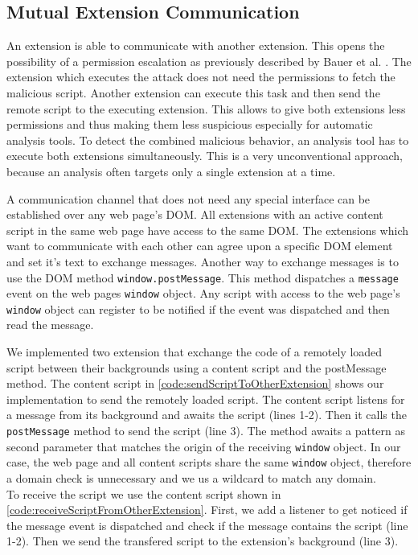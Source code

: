 	
\subsection{Mutual Extension Communication}
\label{sec:mutualExtensionCommunication}

	An extension is able to communicate with another extension. This opens the possibility of a permission escalation as previously described by Bauer et al. \cite{extensions:cns14}. The extension which executes the attack does not need the permissions to fetch the malicious script. Another extension can execute this task and then send the remote script to the executing extension. This allows to give both extensions less permissions and thus making them less suspicious especially for automatic analysis tools. To detect the combined malicious behavior, an analysis tool has to execute both extensions simultaneously. This is a very unconventional approach, because an analysis often targets only a single extension at a time. 
	
	A communication channel that does not need any special interface can be established over any web page's DOM. All extensions with an active content script in the same web page have access to the same DOM. The extensions which want to communicate with each other can agree upon a specific DOM element and set it's text to exchange messages. Another way to exchange messages is to use the DOM method \texttt{window.postMessage}. This method dispatches a \texttt{message} event on the web pages \texttt{window} object. Any script with access to the web page's \texttt{window} object can register to be notified if the event was dispatched and then read the message. 
	
	We implemented two extension that exchange the code of a remotely loaded script between their backgrounds using a content script and the postMessage method. The content script in \autoref{code:sendScriptToOtherExtension} shows our implementation to send the remotely loaded script. The content script listens for a message from its background and awaits the script (lines 1-2). Then it calls the \texttt{postMessage} method to send the script (line 3). The method awaits a pattern as second parameter that matches the origin of the receiving \texttt{window} object. In our case, the web page and all content scripts share the same \texttt{window} object, therefore a domain check is unnecessary and we us a wildcard to match any domain. \\
	To receive the script we use the content script shown in \autoref{code:receiveScriptFromOtherExtension}. First, we add a listener to get noticed if the message event is dispatched and check if the message contains the script (line 1-2). Then we send the transfered script to the extension's background (line 3). 
	

